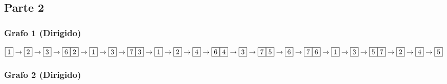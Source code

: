 \documentclass[letterpaper, fleqn]{report}
\begin{document}
\subsection*{Parte 2}
\subsubsection*{Grafo 1 (Dirigido)}
$
\fbox{1}\rightarrow\fbox{2}\rightarrow\fbox{3}\rightarrow\fbox{6}\\
\fbox{2}\rightarrow\fbox{1}\rightarrow\fbox{3}\rightarrow\fbox{7}\\
\fbox{3}\rightarrow\fbox{1}\rightarrow\fbox{2}\rightarrow\fbox{4}\rightarrow\fbox{6}\\
\fbox{4}\rightarrow\fbox{3}\rightarrow\fbox{7}\\
\fbox{5}\rightarrow\fbox{6}\rightarrow\fbox{7}\\
\fbox{6}\rightarrow\fbox{1}\rightarrow\fbox{3}\rightarrow\fbox{5}\\
\fbox{7}\rightarrow\fbox{2}\rightarrow\fbox{4}\rightarrow\fbox{5}
$
\subsubsection*{Grafo 2 (Dirigido)}
%
\end{document}
